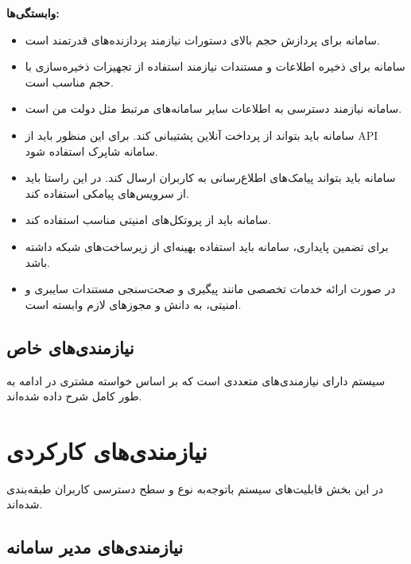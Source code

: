 \documentclass[12pt,a4paper,oneside]{article}
\begin{document}
			\textbf{وابستگی‌ها:}
			\begin{itemize}
				\item 
				سامانه برای پردازش حجم بالای دستورات نیازمند پردازنده‌های قدرتمند است.
			
				\item 
				سامانه برای ذخیره اطلاعات و مستندات نیازمند استفاده از تجهیزات ذخیره‌سازی با حجم مناسب است.
			
				\item 
				سامانه نیازمند دسترسی به اطلاعات سایر سامانه‌های مرتبط مثل دولت من است.
			
				\item 
				سامانه باید بتواند از پرداخت آنلاین پشتیبانی کند. برای این منظور باید از API سامانه شاپرک
				استفاده شود.
			
				\item 
				سامانه باید بتواند پیامک‌های اطلاع‌رسانی به کاربران ارسال کند. در این راستا باید از  سرویس‌های پیامکی
				استفاده کند.
			
				\item 
				سامانه باید از پروتکل‌های امنیتی مناسب استفاده کند.
			
				\item 
				برای تضمین پایداری، سامانه باید استفاده بهینه‌ای از زیرساخت‌های شبکه داشته باشد.
			
				\item 
				در صورت ارائه خدمات تخصصی مانند پیگیری و صحت‌سنجی مستندات سایبری و امنیتی، به دانش و مجوزهای لازم وابسته است.
			\end{itemize}
				
	\subsection{نیازمندی‌های خاص}
	سیستم دارای نیازمندی‌های متعددی است که بر اساس خواسته مشتری در ادامه به طور کامل شرح داده شده‌اند.

	\section*{نیازمندی‌های کارکردی}

	در این بخش قابلیت‌های سیستم باتوجه‌به نوع و سطح دسترسی کاربران طبقه‌بندی شده‌اند.
	
	\subsection*{نیازمندی‌های مدیر سامانه}
	
\end{document}
